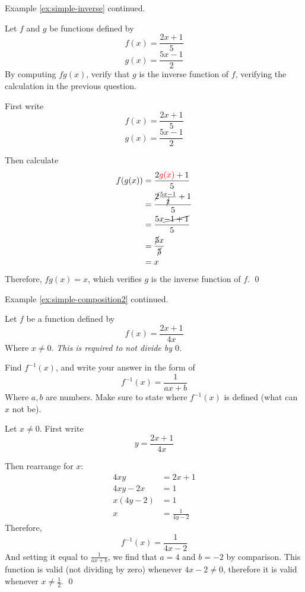 \begin{example} \label{ex:simple-inverse-verification}
    Example \ref{ex:simple-inverse} continued.

    Let $f$ and $g$ be functions defined by 
    \[ f(x) = \frac{2x + 1}{5}\]
    \[ g(x) = \frac{5x - 1}{2}\]
    By computing $fg(x)$, verify that $g$ is the inverse function of $f$, verifying the calculation in the previous question.

\end{example}
\begin{solution}
    First write 
    \[ f(x) = \frac{2x + 1}{5}\]
    \[ g(x) = \frac{5x - 1}{2}\]

    Then calculate
    \begin{align*}
        f(g(x)) &= \frac{2\textcolor{red}{g(x)} + 1}{5} \\
         &= \frac{\cancel{2}\frac{5x - 1}{\cancel{2}} + 1}{5} \\
         &= \frac{5x \cancel{- 1 + 1}}{5}  \\
         &= \frac{\cancel{5}x}{\cancel{5}} \\
         &= x
    \end{align*}
    Therefore, $fg(x) = x$, which verifies $g$ is the inverse function of $f$.
    \qed
\end{solution}



\begin{example} \label{ex:simple-inverse2}
    Example \ref{ex:simple-composition2} continued.

    Let $f$ be a function defined by 
    \[ f(x) = \frac{2x + 1}{4x}\]
    Where $x \neq 0$. \emph{This is required to not divide by $0$.}

    Find $f^{-1}(x)$, and write your answer in the form of
    \[f^{-1}(x) = \frac{1}{ax + b}\]
    Where $a,b$ are numbers. Make sure to state where $f^{-1}(x)$ is defined (what can $x$ not be).


\end{example}
\begin{solution}
    Let $x \neq 0$. First write 
    \[y = \frac{2x + 1}{4x}\]

    Then rearrange for $x$:
    \begin{align*}
        4xy &= 2x+1 \tag{multiply by $4x$}\\
        4xy -2x &= 1 \tag{minus $2x$ to get $x$ on one side}\\
        x(4y - 2) &= 1 \tag{factorise $x$}\\
        x &= \frac{1}{4y-2} \tag{divide by $4y - 2$}
    \end{align*}
    Therefore, 
    \[ f^{-1}(x) = \frac{1}{4x-2}\]
    And setting it equal to $\frac{1}{ax + b}$, we find that $a = 4$ and $b = -2$ by comparison.
    This function is valid (not dividing by zero) whenever $4x- 2 \neq 0$, therefore it is valid whenever $x \neq \frac{1}{2}$.
    \qed
\end{solution}

